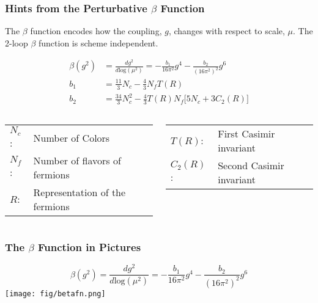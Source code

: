 \begin{frame}
  \frametitle{Hints from the Perturbative $\beta$ Function}
  The $\beta$ function encodes how the coupling, $g$, changes with respect to scale, $\mu$.
  The 2-loop $\beta$ function is scheme independent.
  \begin{center}
    \begin{align*}
      \beta(g^2)&=\frac{d g^2}{d\text{log}(\mu^2)}=-\frac{b_1}{16\pi^2}g^4-\frac{b_2}{(16\pi^2)^2}g^6\\
      b_1&=\frac{11}{3}N_c-\frac{4}{3}N_fT(R)\\
      b_2&=\frac{34}{3}N_c^2-\frac{4}{3}T(R)N_f\Big[5N_c+3C_2(R)\Big]
    \end{align*}
  \end{center}
  \vspace{12pt}
  \begin{columns}[T]
    \begin{column}{.5\textwidth}
      \small
      \begin{tabular}{l l}
        $N_c$: & Number of Colors\\
        $N_f$: & Number of flavors of fermions\\
        $R$:   & Representation of the fermions
      \end{tabular}
    \end{column}
    \begin{column}{.5\textwidth}
      \small
      \begin{tabular}{l l}
        $T(R)$: & First Casimir invariant\\
        $C_2(R)$: & Second Casimir invariant
      \end{tabular}
    \end{column}
  \end{columns}
\end{frame}

\begin{frame}
  \frametitle{The $\beta$ Function in Pictures}
  \begin{equation*}
    \beta(g^2)=\frac{d g^2}{d\text{log}(\mu^2)}=-\frac{b_1}{16\pi^2}g^4-\frac{b_2}{(16\pi^2)^2}g^6
  \end{equation*}
  \centering
  \texttt{[image: fig/betafn.png]}
\end{frame}


